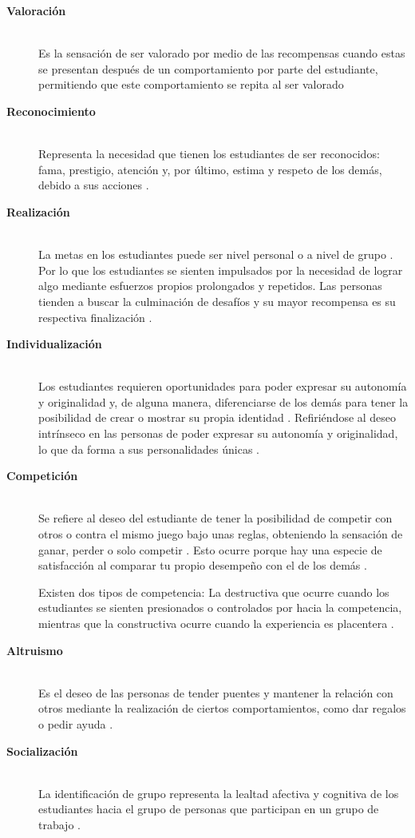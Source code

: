 \begin{description}
\item[\textbf{Valoración}] \hfill \\ Es la sensación de ser valorado por medio de las recompensas cuando estas
se presentan después de un comportamiento por parte del estudiante, permitiendo que este comportamiento se 
repita al ser valorado \cite{DAROCHASEIXAS201648}
\item[\textbf{Reconocimiento}] \hfill \\ Representa la necesidad que tienen los estudiantes de ser
reconocidos: fama, prestigio, atención y, por último, estima y respeto de los demás, debido a sus acciones
\cite{DAROCHASEIXAS201648}.
\item[\textbf{Realización}] \hfill \\ La metas en los estudiantes puede ser nivel personal o a nivel de grupo
\cite{doi:10.1089/cyber.2012.0492}. Por lo que los estudiantes se sienten impulsados por la necesidad de
lograr algo mediante esfuerzos propios prolongados y repetidos. Las personas tienden a buscar la culminación
de desafíos y su mayor recompensa es su respectiva finalización \cite{DAROCHASEIXAS201648}.
\item[\textbf{Individualización}] \hfill \\ Los estudiantes requieren oportunidades para poder expresar su
autonomía y originalidad y, de alguna manera, diferenciarse de los demás para tener la posibilidad de crear o
mostrar su propia identidad \cite{DAROCHASEIXAS201648}. Refiriéndose al deseo intrínseco en las personas de
poder expresar su autonomía y originalidad, lo que da forma a sus personalidades únicas 
\cite{doi:10.1089/cyber.2012.0492}.
\item[\textbf{Competición}] \hfill \\ Se refiere al deseo del estudiante de tener la posibilidad de competir
con otros o contra el mismo juego bajo unas reglas, obteniendo la sensación de ganar, perder o solo competir
\cite{doi:10.1089/cyber.2012.0492}. Esto ocurre porque hay una especie de satisfacción al comparar tu propio
desempeño con el de los demás \cite{DAROCHASEIXAS201648}.

Existen dos tipos de competencia: La destructiva que ocurre cuando los estudiantes se sienten presionados o
controlados por hacia la competencia, mientras que la constructiva ocurre cuando la experiencia es placentera
\cite{DING20191}.
\item[\textbf{Altruismo}] \hfill \\ Es el deseo de las personas de tender puentes y mantener la relación con
otros mediante la realización de ciertos comportamientos, como dar regalos o pedir ayuda
\cite{doi:10.1089/cyber.2012.0492}.
\item[\textbf{Socialización}] \hfill \\ La identificación de grupo representa la lealtad afectiva y cognitiva
de los estudiantes hacia el grupo de personas que participan en un grupo de trabajo
\cite{doi:10.1089/cyber.2012.0492}.


\end{description}
